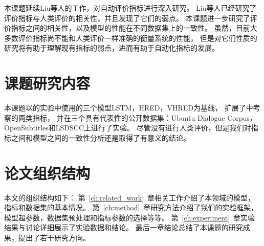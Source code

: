 本课题延续Liu等人的工作，对自动评价指标进行深入研究。
Liu等人已经研究了评价指标与人类评价的相关性，并且发现了它们的弱点。
本课题进一步研究了评价指标之间的相关性，以及模型的性能在不同数据集上的一致性。
虽然，目前大多数评价指标尚不能和人类评价一样准确的衡量系统的性能，
但是对它们性质的研究将有助于理解现有指标的弱点，进而有助于自动化指标的发展。

\section{课题研究内容}\label{sec:reseach_content}
本课题以的实验中使用的三个模型LSTM，HRED，VHRED为基线，
扩展了中考察的两类指标，
并在三个具有代表性的公开数据集：Ubuntu Dialogue Corpus，OpenSubtitles和LSDSCC上进行了实验。
尽管没有进行人类评价，但是我们对指标之间和模型之间的一致性分析还是取得了有意义的结论。

\section{论文组织结构}\label{sec:paper_organization}
本文的组织结构如下：
第~\ref{ch:related_work}~章相关工作介绍了本领域的模型，指标和数据集的基本情况。
第~\ref{ch:method}~章研究方法介绍了我们的实验框架，模型超参数，数据集预处理和指标参数的选择等等。
第~\ref{ch:experiment}~章实验结果与讨论详细展示了实验数据和结论。
最后一章结论总结了本课题的研究成果，提出了若干研究方向。
